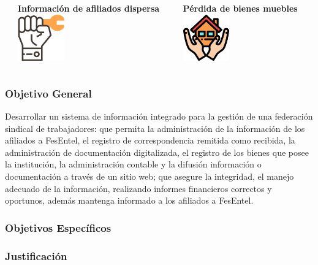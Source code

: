 \documentclass[xcolor=dvipsnames]{beamer}
\begin{document}
\begin{frame}
\begin{columns}
\begin{column}{0.3\textwidth}
      \end{column}
      \begin{column}{0.3\textwidth}
        \centering\textbf{\textcolor{color3}{\small Información de afiliados dispersa}\vspace{3mm}}
        \vspace{10mm}
        \includegraphics[width=20mm]{005-union.pdf}
      \end{column}
      \begin{column}{0.3\textwidth}
        \centering\textbf{\textcolor{color3}{\small Pérdida de bienes muebles}\vspace{3mm}}
        \vspace{10mm}
        \includegraphics[width=20mm]{031-house.pdf}
      \end{column}      
    \end{columns}
\end{frame}

\begin{frame}
    \frametitle{Objetivo General}
 
  \centering\large Desarrollar un sistema de información integrado para la gestión de una federación
sindical de trabajadores: que permita la administración de la información de
los afiliados a FesEntel, el registro de correspondencia remitida como recibida,
la administración de documentación digitalizada, el registro de los bienes
que posee la institución, la administración contable y la difusión información
o documentación a través de un sitio web; que asegure la integridad, el
manejo adecuado de la información, realizando informes financieros correctos
y oportunos, además mantenga informado a los afiliados a FesEntel.

\end{frame}

\begin{frame}
    \frametitle{Objetivos Específicos}
\end{frame}

\begin{frame}
    \frametitle{Justificación}
\end{frame}
\end{document}
